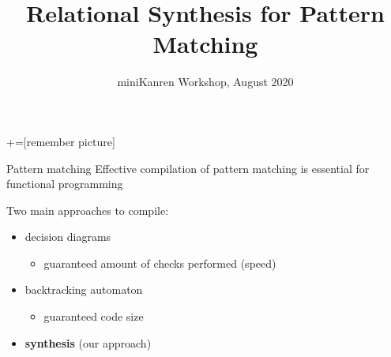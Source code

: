 \documentclass[aspectratio=169
  , xcolor={svgnames}
  , hyperref={ colorlinks,citecolor=Blue
             , linkcolor=DarkRed,urlcolor=DarkBlue}
  , russian
  ]{beamer}
\title{Relational Synthesis for Pattern Matching}
\date{miniKanren Workshop, August 2020}
\begin{document}
\maketitle

+=[remember picture] 

\everymath{\displaystyle}

\begin{frame}{Pattern matching}
Effective compilation of pattern matching is essential for functional programming
\vspace{1cm}

Two main approaches to compile:
\begin{itemize}
\item decision diagrams
\begin{itemize}
\item guaranteed amount of checks performed (speed)
\end{itemize}
\item backtracking automaton
\begin{itemize}
\item guaranteed code size
\end{itemize}\pause
\item \textbf{synthesis} (our approach)
\end{itemize}
  \note{}
  
\end{frame}
\end{document}
